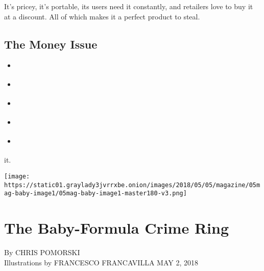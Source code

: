 It's pricey, it's portable, its users need it constantly, and retailers
love to buy it at a discount. All of which makes it a perfect product to
steal.

\hypertarget{the-money-issue}{%
\subsection{The Money Issue}\label{the-money-issue}}

\begin{itemize}
\tightlist
\item
  \href{https://www.nytimes3xbfgragh.onion/interactive/2018/05/02/magazine/money-issue-baby-formula-crime-ring.html?action=click\&module=MagazineModule\&pgtype=Article\&contentCollection=Magazine\&region=Header}{}
\item
  \href{https://www.nytimes3xbfgragh.onion/interactive/2018/05/02/magazine/money-issue-insys-opioids-kickbacks.html?action=click\&module=MagazineModule\&pgtype=Article\&contentCollection=Magazine\&region=Header}{}
\item
  \href{https://www.nytimes3xbfgragh.onion/interactive/2018/05/03/magazine/money-issue-bangladesh-billion-dollar-bank-heist.html?action=click\&module=MagazineModule\&pgtype=Article\&contentCollection=Magazine\&region=Header}{}
\item
  \href{https://www.nytimes3xbfgragh.onion/interactive/2018/05/03/magazine/money-issue-iowa-lottery-fraud-mystery.html?action=click\&module=MagazineModule\&pgtype=Article\&contentCollection=Magazine\&region=Header}{}
\item
  \href{https://www.nytimes3xbfgragh.onion/interactive/2018/05/03/magazine/money-issue-white-collar-crimes-cheat-sheet.html?action=click\&module=MagazineModule\&pgtype=Article\&contentCollection=Magazine\&region=Header}{}
\end{itemize}

it.

\texttt{[image: https://static01.graylady3jvrrxbe.onion/images/2018/05/05/magazine/05mag-baby-image1/05mag-baby-image1-master180-v3.png]}

\hypertarget{the-baby-formula-crime-ring-1}{%
\section{The Baby-Formula Crime
Ring}\label{the-baby-formula-crime-ring-1}}

By CHRIS POMORSKI\\
Illustrations by FRANCESCO FRANCAVILLA MAY 2, 2018

